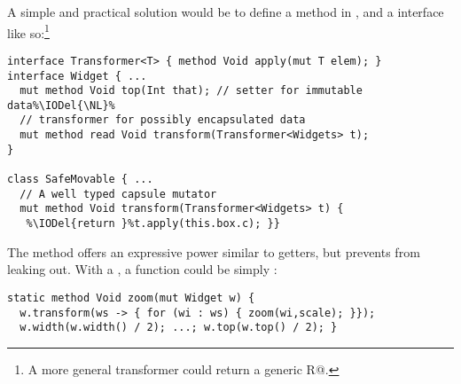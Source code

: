 A simple and practical solution would be to define a \Q@transform@ method in \Q@Widget@, and a \Q@Transformer@ interface 
like so:\footnote{A more general transformer could return a generic \Q@read R@.}
\begin{lstlisting}[escapechar=\%]
interface Transformer<T> { method Void apply(mut T elem); }
interface Widget { ...
  mut method Void top(Int that); // setter for immutable data%\IODel{\NL}%
  // transformer for possibly encapsulated data
  mut method read Void transform(Transformer<Widgets> t);
}

class SafeMovable { ...
  // A well typed capsule mutator
  mut method Void transform(Transformer<Widgets> t) {
   %\IODel{return }%t.apply(this.box.c); }}
\end{lstlisting}\saveSpace
The \Q@transform@ method offers an expressive power similar to \Q@mut@ getters, but prevents \Q@Widgets@ from leaking out.  With a \Q@Transformer@, a \Q@zoom@ function could be simply :
\begin{lstlisting}
static method Void zoom(mut Widget w) {
  w.transform(ws -> { for (wi : ws) { zoom(wi,scale); }});
  w.width(w.width() / 2); ...; w.top(w.top() / 2); }
\end{lstlisting}




